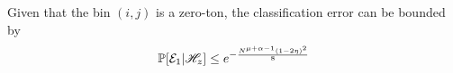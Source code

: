 \begin{lemma}
\label{Lem:ZerotonClassif}
Given that the bin $(i,j)$ is a zero-ton, the classification error can be bounded by
\begin{align*}
\mathbb{P}[\mathcal{E}_1|\mathscr{H}_z]\leq e^{-\frac{N^{\mu+\alpha-1}(1-2\eta)^2}{8}}
\end{align*}
\end{lemma}


